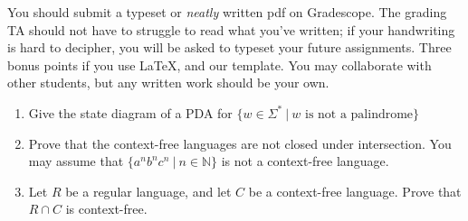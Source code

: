 \documentclass[11pt]{article}
\begin{document}

You should submit a typeset or \emph{neatly} written pdf on Gradescope.  The grading TA should not have to struggle to read what you've written; if your handwriting is hard to decipher, you will be asked to typeset your future assignments. Three bonus points if you use \LaTeX, and our template. You may collaborate with other students, but any written work should be your own. 

\begin{enumerate}
    \item Give the state diagram of a PDA for $\{w \in \Sigma^* ~|~ w \text{ is not a palindrome}\}$
        
           \begin{answer}
        
            \end{answer}

    \item Prove that the context-free languages are not closed under intersection. You may assume that $\{a^nb^nc^n~|~n \in \mathbb{N}\}$ is not a context-free language. 

            
           \begin{answer}
        
            \end{answer}

    \item Let $R$ be a regular language, and let $C$ be a context-free language. Prove that $R \cap C$ is context-free. 

            
           \begin{answer}
        
            \end{answer}
\end{enumerate}
\end{document}

